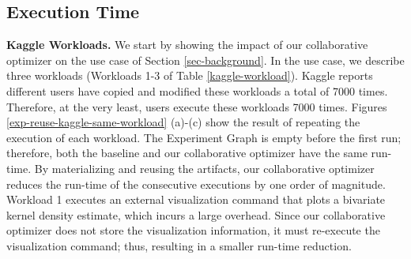 \subsection{Execution Time}
\textbf{Kaggle Workloads.}
We start by showing the impact of our collaborative optimizer on the use case of Section \ref{sec-background}.
In the use case, we describe three workloads (Workloads 1-3 of Table \ref{kaggle-workload}).
Kaggle reports different users have copied and modified these workloads a total of 7000 times.
Therefore, at the very least, users execute these workloads 7000 times.
Figures \ref{exp-reuse-kaggle-same-workload} (a)-(c) show the result of repeating the execution of each workload.
The Experiment Graph is empty before the first run; therefore, both the baseline and our collaborative optimizer have the same run-time.
By materializing and reusing the artifacts, our collaborative optimizer reduces the run-time of the consecutive executions by one order of magnitude.
Workload 1 executes an external visualization command that plots a bivariate kernel density estimate, which incurs a large overhead.
Since our collaborative optimizer does not store the visualization information, it must re-execute the visualization command; thus, resulting in a smaller run-time reduction.
